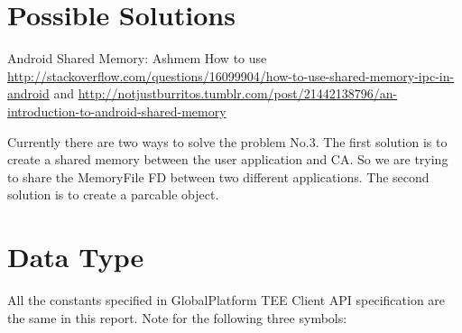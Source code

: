 \documentclass{cseminar}
\begin{document}
\section{Possible Solutions}
Android Shared Memory: Ashmem
How to use \url{http://stackoverflow.com/questions/16099904/how-to-use-shared-memory-ipc-in-android} and \url{http://notjustburritos.tumblr.com/post/21442138796/an-introduction-to-android-shared-memory}

Currently there are two ways to solve the problem No.3. The first solution is to create a shared memory between the user application and CA. So we are trying to share the MemoryFile FD between two different applications. The second solution is to create a parcable object.

\section{Data Type}
All the constants specified in GlobalPlatform TEE Client API specification are the same in this report. Note for the following three symbols:
\end{document}
